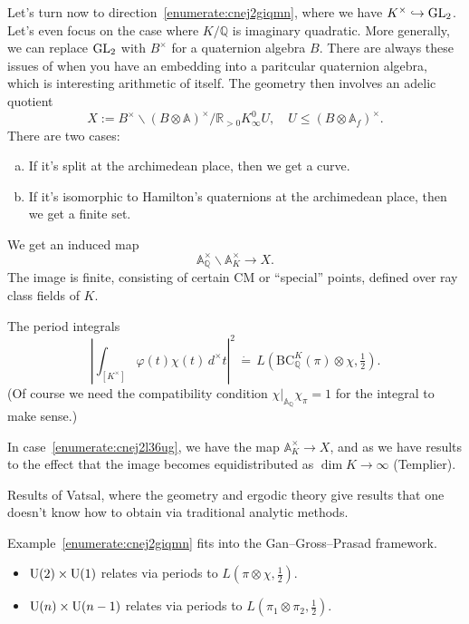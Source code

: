 \documentclass[reqno]{amsart} 
\begin{document}
Let's turn now to direction~\eqref{enumerate:cnej2giqmn}, where we have $K^\times \hookrightarrow \operatorname{GL}_2$.  Let's even focus on the case where $K/\mathbb{Q}$ is imaginary quadratic.  More generally, we can replace $\operatorname{GL}_2$ with $B^\times$ for a quaternion algebra $B$.  There are always these issues of when you have an embedding into a paritcular quaternion algebra, which is interesting arithmetic of itself.  The geometry then involves an adelic quotient
\begin{equation*}
  X
  :=
  B^\times \backslash 
  {(B \otimes \mathbb{A})}^\times
  / \mathbb{R}_{> 0} K _\infty^0 U,
  \quad
  U \leq {(B \otimes \mathbb{A}_f)}^\times.
\end{equation*}
There are two cases:
\begin{enumerate}[(a)]
\item\label{enumerate:cnej2l35vn} If it's split at the archimedean place, then we get a curve.
\item\label{enumerate:cnej2l36ug} If it's isomorphic to Hamilton's quaternions at the archimedean place, then we get a finite set.
\end{enumerate}

We get an induced map
\begin{equation*}
  \mathbb{A}_{\mathbb{Q}}^\times \backslash \mathbb{A}_K^\times \rightarrow X.
\end{equation*}
The image is finite, consisting of certain CM or ``special'' points, defined over ray class fields of $K$.

The period integrals
\begin{equation}\label{eq:cnej2m5ln6}
  \left\lvert \int_{[K^\times]} \varphi(t) \chi(t) \, d^\times t \right\rvert^2
  \, \dot{=} \,
  L(\mathrm{BC}_{\mathbb{Q}}^K(\pi) \otimes \chi, \tfrac{1}{2}).
\end{equation}
(Of course we need the compatibility condition $\chi|_{\mathbb{A}_\mathbb{Q}} \chi_\pi = 1$ for the integral to make sense.)

In case~\eqref{enumerate:cnej2l36ug}, we have the map $\mathbb{A}_K^\times \rightarrow X$, and as we have results to the effect that the image becomes equidistributed as $\dim K \rightarrow \infty$ (Templier).

Results of Vatsal, where the geometry and ergodic theory give results that one doesn't know how to obtain via traditional analytic methods.

Example~\eqref{enumerate:cnej2giqmn} fits into the Gan--Gross--Prasad framework.
\begin{itemize}
\item $\operatorname{U}(2) \times \operatorname{U}(1)$ relates via periods to $L(\pi \otimes \chi, \tfrac{1}{2})$.
\item $\operatorname{U}(n) \times \operatorname{U}(n - 1)$ relates via periods to $L(\pi_1 \otimes \pi_2, \tfrac{1}{2})$.
\end{itemize}
\end{document}
